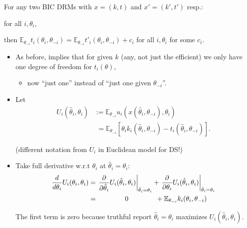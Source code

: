 \documentclass[english]{beamer}		%
\def\lyxframeend{} %
\begin{document}
\begin{theorem}
	For any two BIC DRMs with $x = (k,t)$ and $x' = (k',t')$ resp.:
	 	
	 for all $i,\theta_i$,
	
	\alert{then $\mathbb{E}_{\theta_{-i}} t_i(\theta_i, \theta_{-i}) = \mathbb{E}_{\theta_{-i}} t'_i(\theta_i, \theta_{-i}) + c_i$} for all $i,\theta_i$ for some $c_i$.
\end{theorem}
\begin{itemize}
	\item As before, implies that for given $k$ (any, not just the efficient) we only have one degree of freedom for $t_i(\theta)$,
	\begin{itemize}
		\item now ``just one'' instead of ``just one given $\theta_{-i}$''.
	\end{itemize}
\end{itemize}
\lyxframeend


\begin{itemize}
	\item Let 
	\vspace{-0.5em}\begin{align*}
	U_i (\hat{\theta}_i,\theta_i) &:= \mathbb{E}_{\theta_{-i}} u_i \left( x(\hat{\theta}_i, \theta_{-i}), \theta_i \right)
	\\
	&\,\,= \mathbb{E}_{\theta_{-i}} \left[ \theta_i k_i(\hat{\theta}_i, \theta_{-i}) - t_i \left( \hat{\theta}_i, \theta_{-i} \right) \right].
	\end{align*}\vspace{-1em}
	
	(different notation from $U_i$ in Euclidean model for DS!)
	\pause
	\item Take full derivative w.r.t $\theta_i$ at $\hat{\theta}_i=\theta_i$:
	\vspace{-0.5em}\begin{align*}
		\frac{d}{d \theta_i} U_i (\theta_i,\theta_i) &= \left. \frac{\partial}{\partial \hat{\theta}_i} U_i (\hat{\theta}_i,\theta_i) \right|_{\hat{\theta}_i=\theta_i} + \left. \frac{\partial}{\partial \theta_i} U_i (\hat{\theta}_i,\theta_i) \right|_{\hat{\theta}_i=\theta_i}
		\\ &= \hspace{1.4cm} 0 \hspace{1.4cm} + \mathbb{E}_{\theta_{-i}} k_i (\theta_i, \theta_{-i})
	\end{align*}\vspace{-1em}
	
	The first term is zero because truthful report $\hat{\theta}_i = \theta_i$ maximizes $U_i (\hat{\theta}_i,\theta_i)$.
\end{itemize}
\lyxframeend
\end{document}
